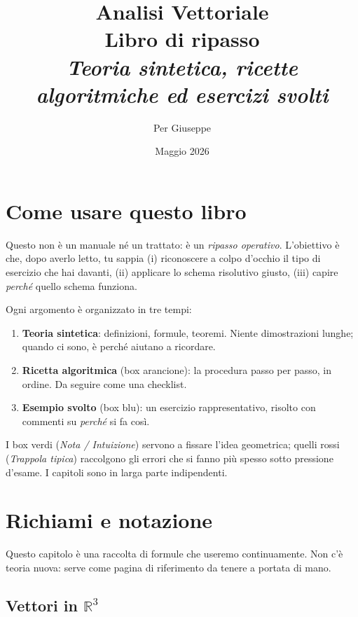 \documentclass[11pt,a4paper,openany]{book}
\title{\Huge\textbf{Analisi Vettoriale}\\[0.4em]\Large Libro di ripasso\\[0.2em]\large {\itshape Teoria sintetica, ricette algoritmiche ed esercizi svolti}}
\author{Per Giuseppe}
\date{Maggio 2026}
\theoremstyle{plain}
\theoremstyle{definition}
\theoremstyle{remark}
\newcommand{\R}{\mathbb{R}}
\begin{document}
\frontmatter
\maketitle
\tableofcontents
\cleardoublepage

\chapter*{Come usare questo libro}

Questo non \`e un manuale n\'e un trattato: \`e un \emph{ripasso operativo}.
L'obiettivo \`e che, dopo averlo letto, tu sappia (i) riconoscere a colpo d'occhio
il tipo di esercizio che hai davanti, (ii) applicare lo schema risolutivo giusto,
(iii) capire \emph{perch\'e} quello schema funziona.

\medskip
Ogni argomento \`e organizzato in tre tempi:
\begin{enumerate}[leftmargin=*]
  \item \textbf{Teoria sintetica}: definizioni, formule, teoremi. Niente
        dimostrazioni lunghe; quando ci sono, \`e perch\'e aiutano a ricordare.
  \item \textbf{Ricetta algoritmica} (box arancione): la procedura passo per
        passo, in ordine. Da seguire come una checklist.
  \item \textbf{Esempio svolto} (box blu): un esercizio rappresentativo,
        risolto con commenti su \emph{perch\'e} si fa cos\`i.
\end{enumerate}

I box verdi (\textsl{Nota / Intuizione}) servono a fissare l'idea geometrica;
quelli rossi (\textsl{Trappola tipica}) raccolgono gli errori che si fanno pi\`u
spesso sotto pressione d'esame. I capitoli sono in larga parte indipendenti.

\mainmatter

\chapter{Richiami e notazione}

Questo capitolo \`e una raccolta di formule che useremo continuamente. Non c'\`e
teoria nuova: serve come pagina di riferimento da tenere a portata di mano.

\section{Vettori in $\R^3$}
\end{document}
